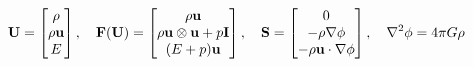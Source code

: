 \documentclass[preview]{standalone}
\begin{document}
\begin{align*}
\special{dvisvgm:raw <g id='unique000'>}
            \mathbf{U} = \begin{bmatrix}\rho \\ \rho\mathbf{u} \\ E\end{bmatrix}, \quad
            \mathbf{F}(\mathbf{U}) = \begin{bmatrix}\rho\mathbf{u} \\ \rho\mathbf{u}\otimes\mathbf{u}+p\mathbf{I} \\ (E+p)\mathbf{u}\end{bmatrix}, \quad
            \mathbf{S} = \begin{bmatrix}0 \\ -\rho\nabla\phi \\ -\rho\mathbf{u}\cdot\nabla\phi\end{bmatrix},
            \quad \nabla^2\phi = 4\pi G \rho
            \special{dvisvgm:raw </g>}
\end{align*}
\end{document}
